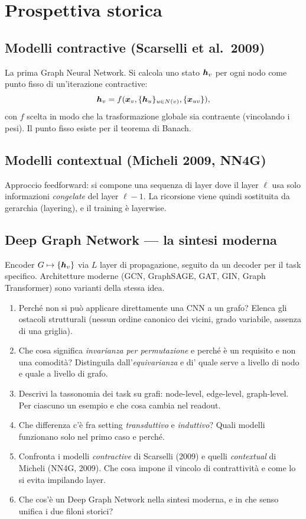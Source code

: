 \section{Prospettiva storica}

\subsection{Modelli contractive (Scarselli et al.\ 2009)}
La prima Graph Neural Network. Si calcola uno stato $\bm{h}_v$ per ogni nodo come punto fisso di un'iterazione contractive:
\[
\bm{h}_v = f(\bm{x}_v, \{\bm{h}_u\}_{u\in N(v)}, \{\bm{x}_{uv}\}),
\]
con $f$ scelta in modo che la trasformazione globale sia contraente (vincolando i pesi). Il punto fisso esiste per il teorema di Banach.

\subsection{Modelli contextual (Micheli 2009, NN4G)}
Approccio feedforward: si compone una sequenza di layer dove il layer $\ell$ usa solo informazioni \emph{congelate} del layer $\ell-1$. La ricorsione viene quindi sostituita da gerarchia (layering), e il training è layerwise.

\subsection{Deep Graph Network — la sintesi moderna}
Encoder $G \mapsto \{\bm{h}_v\}$ via $L$ layer di propagazione, seguito da un decoder per il task specifico. Architetture moderne (GCN, GraphSAGE, GAT, GIN, Graph Transformer) sono varianti della stessa idea.

\begin{tcolorbox}[mywarn, title={Domande d'esame — Fondamenti di DL per grafi}]
\begin{enumerate}
  \item Perché non si può applicare direttamente una CNN a un grafo? Elenca gli ostacoli strutturali (nessun ordine canonico dei vicini, grado variabile, assenza di una griglia).
  \item Che cosa significa \emph{invarianza per permutazione} e perché è un requisito e non una comodità? Distinguila dall'\emph{equivarianza} e di' quale serve a livello di nodo e quale a livello di grafo.
  \item Descrivi la tassonomia dei task su grafi: node-level, edge-level, graph-level. Per ciascuno un esempio e che cosa cambia nel readout.
  \item Che differenza c'è fra setting \emph{transduttivo} e \emph{induttivo}? Quali modelli funzionano solo nel primo caso e perché.
  \item Confronta i modelli \emph{contractive} di Scarselli (2009) e quelli \emph{contextual} di Micheli (NN4G, 2009). Che cosa impone il vincolo di contrattività e come lo si evita impilando layer.
  \item Che cos'è un Deep Graph Network nella sintesi moderna, e in che senso unifica i due filoni storici?
\end{enumerate}
\end{tcolorbox}

